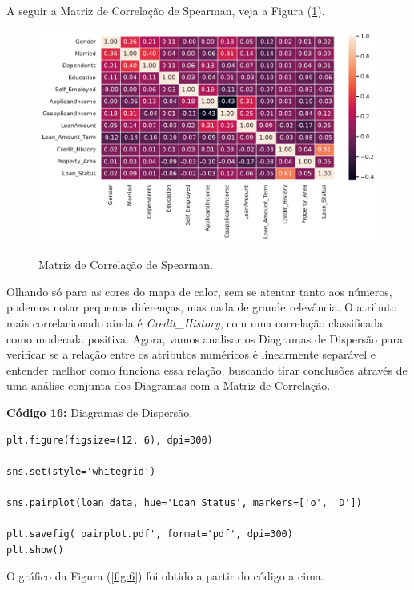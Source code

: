 \documentclass[a4paper,12pt]{article} %
\begin{document}
A seguir a Matriz de Correlação de Spearman, veja a Figura (\ref{fig:5}).

\begin{figure}[H]
    \centering
    \caption{Matriz de Correlação de Spearman.}
    \includegraphics[scale=0.65]{Figures/spearman.pdf} \\
    \label{fig:5}
\end{figure}

Olhando só para as cores do mapa de calor, sem se atentar tanto aos números, podemos notar pequenas diferenças, mas nada de grande relevância. O atributo mais correlacionado ainda é \textit{Credit\_History}, com uma correlação classificada como moderada positiva. Agora, vamos analisar os Diagramas de Dispersão para verificar se a relação entre os atributos numéricos é linearmente separável e entender melhor como funciona essa relação, buscando tirar conclusões através de uma análise conjunta dos Diagramas com a Matriz de Correlação.
\begin{center}
\textbf{Código 16:} Diagramas de Dispersão.
\begin{verbatim}
plt.figure(figsize=(12, 6), dpi=300)

sns.set(style='whitegrid')

sns.pairplot(loan_data, hue='Loan_Status', markers=['o', 'D'])

plt.savefig('pairplot.pdf', format='pdf', dpi=300)
plt.show()
\end{verbatim}
\end{center}

O gráfico da Figura (\ref{fig:6}) foi obtido a partir do código a cima.
\end{document}
